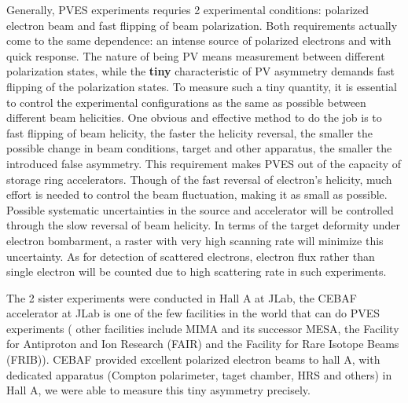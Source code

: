 Generally, PVES experiments requries 2 experimental conditions: polarized electron
beam and fast flipping of beam polarization. Both requirements actually come to 
the same dependence: an intense source of polarized electrons and with quick response. 
The nature of being PV means measurement between different polarization states, 
while the \textbf{tiny} characteristic of PV asymmetry
demands fast flipping of the polarization states.
To measure such a tiny quantity, it is essential to control
the experimental configurations as the same as possible between different
beam helicities. One obvious and effective method to do the job is to fast 
flipping of beam helicity, the faster the helicity reversal, the smaller
the possible change in beam conditions, target and other apparatus, the smaller
the introduced false asymmetry. This requirement makes PVES out of the capacity
of storage ring accelerators.
Though of the fast reversal of electron's helicity, much effort is needed to
control the beam fluctuation, making it as small as possible. Possible systematic
uncertainties in the source and accelerator will be controlled through the slow
reversal of beam helicity. In terms of the target deformity under electron bombarment,
a raster with very high scanning rate will minimize this uncertainty. As for 
detection of scattered electrons, electron flux rather than single electron will
be counted due to high scattering rate in such experiments.

The 2 sister experiments were conducted in Hall A at JLab, the CEBAF accelerator 
at JLab is one of the few facilities in the world that can do PVES experiments (
other facilities include MIMA and its successor MESA, the Facility for Antiproton
and Ion Research (FAIR) and the Facility for Rare Isotope Beams (FRIB)). CEBAF 
provided excellent polarized electron beams to hall A, with dedicated apparatus 
(Compton polarimeter, taget chamber, HRS and others) in Hall A, we were able 
to measure this tiny asymmetry precisely.

